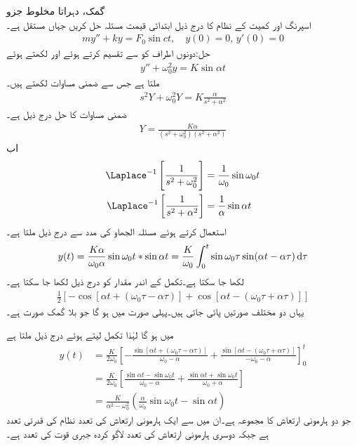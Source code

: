 \quad گمک، دہراتا مخلوط جزو\\
اسپرنگ اور کمیت کے نظام کا درج ذیل ابتدائی قیمت مسئلہ حل کریں جہاں  مستقل ہے۔
\begin{align*}
my''+ky=F_0\sin ct,\quad y(0)=0,\, y'(0)=0
\end{align*}
حل:دونوں اطراف کو  سے تقسیم کرتے ہوئے  اور  لکھتے ہوئے
\begin{align*}
y''+\omega_0^2y=K\sin \alpha t
\end{align*}
ملتا ہے جس سے ضمنی مساوات لکھتے ہیں۔
\begin{align*}
s^2Y+\omega_0^2Y=K\frac{\alpha }{s^2+\alpha^2}
\end{align*} 
ضمنی مساوات کا حل درج ذیل ہے۔
\begin{align*}
Y=\frac{K\alpha}{(s^2+\omega_0^2)(s^2+\alpha^2)}
\end{align*}
اب 
\begin{align*}
\Laplace^{-1}\left[\frac{1}{s^2+\omega_0^2}\right]&=\frac{1}{\omega_0} \sin \omega_0 t\\
\Laplace^{-1}\left[\frac{1}{s^2+\alpha^2}\right]&=\frac{1}{\alpha} \sin \alpha t
\end{align*}
استعمال کرتے ہوئے مسئلہ الجھاو کی مدد سے درج ذیل ملتا ہے۔
\begin{align*}
y(t)=\frac{K \alpha}{\omega_0 \alpha} \sin \omega_0 t * \sin \alpha t=\frac{K}{\omega_0}\int_{0}^{t}\sin \omega_0 \tau \sin (\alpha t-\alpha \tau)\dif \tau
\end{align*}
لکھا جا سکتا ہے۔تکمل کے اندر مقدار کو درج ذیل لکھا جا سکتا ہے۔
\begin{align}\label{مساوات_لاپلاس_گمک_الف}
\frac{1}{2}[-\cos[\alpha t+(\omega_0 \tau-\alpha \tau)]+\cos[\alpha t-(\omega_0 \tau+\alpha \tau)]]
\end{align}
یہاں دو مختلف صورتیں پائی جاتی ہیں۔پہلی صورت میں  ہو گا جو بلا گمک صورت ہے۔

 میں  ہو گا لہٰذا تکمل لیتے ہوئے درج ذیل ملتا ہے
\begin{align*}
y(t)&=\frac{K}{2\omega_0}\left[-\frac{\sin[\alpha t+(\omega_0 \tau-\alpha \tau)]}{\omega_0-\alpha}+\frac{\sin[\alpha t-(\omega_0 \tau+\alpha \tau)]}{-\omega_0-\alpha}\right]_{0}^{t}\\
&=\frac{K}{2\omega_0}\left[\frac{\sin \alpha t-\sin \omega_0 t}{\omega_0-\alpha}+\frac{\sin \alpha t+\sin \omega_0 t}{\omega_0+\alpha}\right]\\
&=\frac{K}{\alpha^2-\omega_0^2}(\frac{\alpha}{\omega_0}\sin \omega_0 t-\sin \alpha t)
\end{align*}
جو دو ہارمونی ارتعاش کا مجموعہ ہے۔ان میں سے ایک ہارمونی ارتعاش کی تعدد نظام کی قدرتی تعدد  ہے جبکہ دوسری ہارمونی ارتعاش کی تعدد لاگو کردہ جبری قوت کی تعدد  ہے۔

